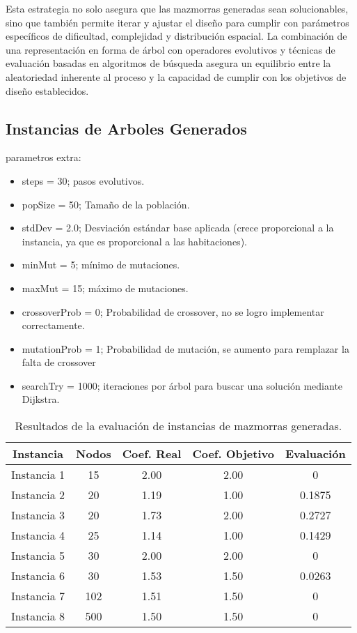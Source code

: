 \documentclass[letter, 10pt]{article}
\begin{document}
Esta estrategia no solo asegura que las mazmorras generadas sean solucionables, sino que tambi\'en permite iterar y ajustar el dise\~no para cumplir con par\'ametros espec\'ificos de dificultad, complejidad y distribuci\'on espacial. La combinaci\'on de una representaci\'on en forma de \'arbol con operadores evolutivos y t\'ecnicas de evaluaci\'on basadas en algoritmos de b\'usqueda asegura un equilibrio entre la aleatoriedad inherente al proceso y la capacidad de cumplir con los objetivos de dise\~no establecidos.

\subsection*{Instancias de Arboles Generados}
parametros extra:
\begin{itemize}
    \item steps = 30; pasos evolutivos.
    \item popSize = 50; Tama\~no de la poblaci\'on.
    \item stdDev = 2.0; Desviaci\'on est\'andar base aplicada (crece proporcional a la instancia, ya que es proporcional a las habitaciones).
    \item minMut = 5; m\'inimo de mutaciones.
    \item maxMut = 15; m\'aximo de mutaciones.
    \item crossoverProb = 0; Probabilidad de crossover, no se logro implementar correctamente.
    \item mutationProb = 1; Probabilidad de mutaci\'on, se aumento para remplazar la falta de crossover
    \item searchTry = 1000; iteraciones por \'arbol para buscar una soluci\'on mediante Dijkstra.
\end{itemize}

\begin{table}[h!]
\centering
\begin{tabular}{|c|c|c|c|c|}
\hline
\textbf{Instancia} & \textbf{Nodos} & \textbf{Coef. Real} & \textbf{Coef. Objetivo} & \textbf{Evaluaci\'on} \\
\hline
Instancia 1 & 15 & 2.00 & 2.00 & 0 \\
Instancia 2 & 20 & 1.19 & 1.00 & 0.1875 \\
Instancia 3 & 20 & 1.73 & 2.00 & 0.2727 \\
Instancia 4 & 25 & 1.14 & 1.00 & 0.1429 \\
Instancia 5 & 30 & 2.00 & 2.00 & 0 \\
Instancia 6 & 30 & 1.53 & 1.50 & 0.0263 \\
Instancia 7 & 102 & 1.51 & 1.50 & 0 \\
Instancia 8 & 500 & 1.50 & 1.50 & 0 \\
\hline
\end{tabular}
\caption{Resultados de la evaluaci\'on de instancias de mazmorras generadas.}
\end{table}
\end{document}
